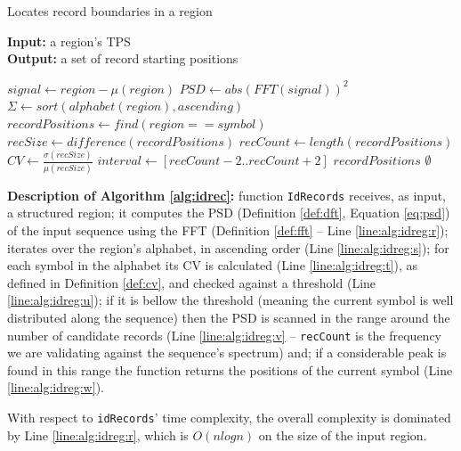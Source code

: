 \documentclass{vldb}
\begin{document}
\begin{algorithm}
\caption{Locates record boundaries in a region}
\label{alg:idrec}
\textbf{Input:} a region's TPS \\
\textbf{Output:} a set of record starting positions

\begin{algorithmic}[1]

\State $signal \leftarrow region-\mu(region)$ 
\State $PSD \leftarrow abs(FFT(signal))^2$\label{line:alg:idreg:r}
\State $\Sigma \leftarrow sort(alphabet(region), ascending)$
\label{line:alg:idreg:s}
\State $recordPositions \leftarrow find(region == symbol)$
\State $recSize \leftarrow difference(recordPositions)$
\State $recCount \leftarrow length(recordPositions)$
\State $CV \leftarrow
\frac{\sigma(recSize)}{\mu(recSize)}$\label{line:alg:idreg:t}
\label{line:alg:idreg:u}
\State $interval \leftarrow [recCount-2 .. recCount+2]$
\label{line:alg:idreg:v}
\State \Return $recordPositions$\label{line:alg:idreg:w}
\EndIf
\EndIf
\EndFor
\State \Return $\emptyset$
\EndFunction

\end{algorithmic}
\end{algorithm}

\textbf{Description of Algorithm \ref{alg:idrec}:} function \texttt{IdRecords}
receives, as input, a structured region; it computes the PSD (Definition
\ref{def:dft}, Equation \ref{eq:psd}) of the input sequence using the FFT
(Definition \ref{def:fft} -- Line \ref{line:alg:idreg:r}); iterates over the
region's alphabet, in ascending order (Line \ref{line:alg:idreg:s}); for each
symbol in the alphabet its CV is calculated (Line \ref{line:alg:idreg:t}), as
defined in Definition \ref{def:cv}, and checked against a threshold (Line
\ref{line:alg:idreg:u}); if it is bellow the threshold (meaning the current
symbol is well distributed along the sequence) then the PSD is scanned in the
range around the number of candidate records (Line \ref{line:alg:idreg:v} --
\texttt{recCount} is the frequency we are validating against the sequence's
spectrum) and; if a considerable peak is found in this range the function
returns the positions of the current symbol (Line \ref{line:alg:idreg:w}).

With respect to \texttt{idRecords}' time complexity, the overall complexity is
dominated by Line \ref{line:alg:idreg:r}, which is $O(nlogn)$ on the size of the
input region.
\end{document}
